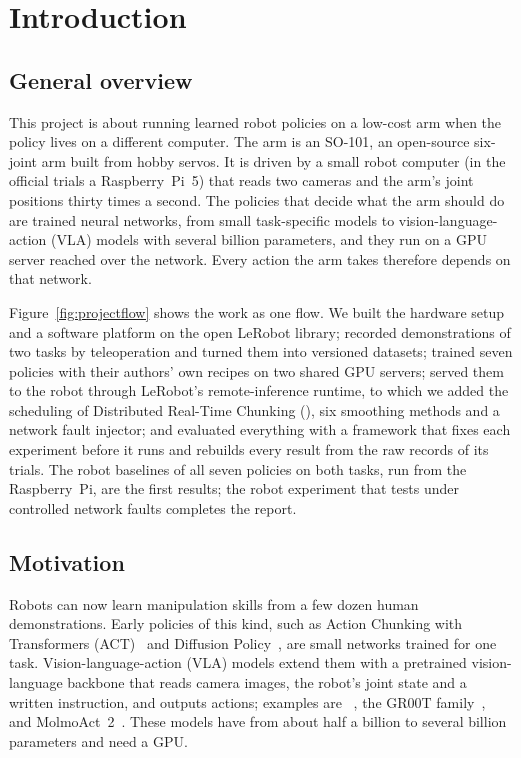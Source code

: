 \chapter{Introduction}\label{ch:intro}

\section{General overview}\label{sec:overview}

This project is about running learned robot policies on a low-cost arm when the policy lives on a different computer.
The arm is an SO-101, an open-source six-joint arm built from hobby servos. It is driven by a small robot computer
(in the official trials a Raspberry~Pi~5) that reads two cameras and the arm's joint positions thirty times a second.
The policies that decide what the arm should do are trained neural networks, from small task-specific models to
vision-language-action (VLA) models with several billion parameters, and they run on a GPU server reached over the
network. Every action the arm takes therefore depends on that network.

Figure~\ref{fig:projectflow} shows the work as one flow. We built the hardware setup and a software platform on the
open LeRobot library; recorded demonstrations of two tasks by teleoperation and turned them into versioned datasets;
trained seven policies with their authors' own recipes on two shared GPU servers; served them to the robot through
LeRobot's remote-inference runtime, to which we added the scheduling of Distributed Real-Time Chunking (\drtc), six
smoothing methods and a network fault injector; and evaluated everything with a framework that fixes each experiment
before it runs and rebuilds every result from the raw records of its trials. The robot baselines of all seven policies
on both tasks, run from the Raspberry~Pi, are the first results; the robot experiment that tests \drtc{} under
controlled network faults completes the report.


\section{Motivation}

Robots can now learn manipulation skills from a few dozen human demonstrations. Early policies of this kind, such as
Action Chunking with Transformers (ACT)~\cite{zhao2023act} and Diffusion Policy~\cite{chi2023diffusion}, are small
networks trained for one task. Vision-language-action (VLA) models extend them with a pretrained vision-language
backbone that reads camera images, the robot's joint state and a written instruction, and outputs actions; examples
are \smolvla~\cite{shukor2025smolvla}, the GR00T family~\cite{nvidia2025gr00t}, \pizerofive~\cite{pi2025pi05} and
MolmoAct~2~\cite{molmoact2}. These models have from about half a billion to several billion parameters and need a GPU.

